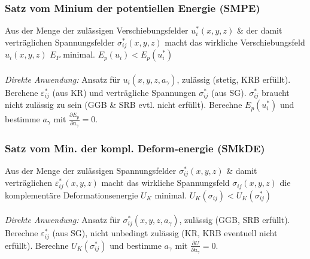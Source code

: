         \subsubsection{Satz vom Minium der potentiellen Energie (SMPE)}
            Aus der Menge der zulässigen Verschiebungsfelder $u_i^*(x,y,z)$ \& der damit verträglichen Spannungsfelder $\sigma_{ij}^*(x,y,z)$ macht das wirkliche Verschiebungsfeld $u_i(x,y,z)$ $E_P$ minimal. $E_p(u_i) < E_p(u_i^*)$\\\\
            \textit{Direkte Anwendung:} Ansatz für $u_i(x,y,z,a_\gamma)$, zulässig (stetig, KRB erfüllt). Berchene $\varepsilon_{ij}^*$ (aus KR) und verträgliche Spannungen $\sigma_{ij}^*$ (aus SG). $\sigma_{ij}^*$ braucht nicht zulässig zu sein (GGB \& SRB evtl. nicht erfüllt). Berechne $E_p(u_i^*)$ und bestimme $a_\gamma$ mit $\frac{\partial E_p}{\partial a_\gamma}=0$.
            
        \subsubsection{Satz vom Min. der kompl. Deform-energie (SMkDE)}
            Aus der Menge der zulässigen Spannungsfelder $\sigma_{ij}^*(x,y,z)$ \& damit verträglichen $\varepsilon_{ij}^*(x,y,z)$ macht das wirkliche Spannungsfeld $\sigma_{ij}(x,y,z)$ die komplementäre Deformationsenergie $U_K$ minimal. $U_K(\sigma_{ij}) < U_K(\sigma_{ij}^*)$\\\\
            \textit{Direkte Anwendung:} Ansatz für $\sigma_{ij}^*(x,y,z,a_\gamma)$, zulässig (GGB, SRB erfüllt). Berechne $\varepsilon_{ij}^*$ (aus SG), nicht unbedingt zulässig (KR, KRB eventuell nicht erfüllt). Berechne $U_K(\sigma_{ij}^*)$ und bestimme $a_\gamma$ mit $\frac{\partial U}{\partial a_\gamma}=0$.
            
